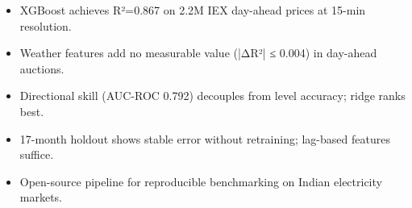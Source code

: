 
\begin{itemize}
\item XGBoost achieves R²=0.867 on 2.2M IEX day-ahead prices at 15-min resolution.
\item Weather features add no measurable value (|ΔR²| ≤ 0.004) in day-ahead auctions.
\item Directional skill (AUC-ROC 0.792) decouples from level accuracy; ridge ranks best.
\item 17-month holdout shows stable error without retraining; lag-based features suffice.
\item Open-source pipeline for reproducible benchmarking on Indian electricity markets.
\end{itemize}
